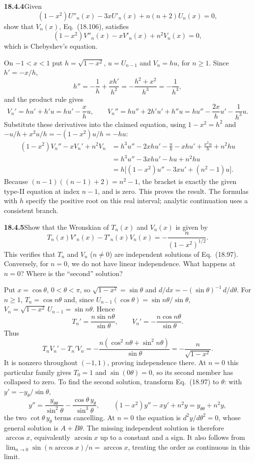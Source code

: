 \par\bigskip
\noindent\textbf{18.4.4}\quad Given
\[
(1-x^{2})U''_{n}(x)-3xU'_{n}(x)+n(n+2)U_{n}(x)=0,
\]
show that $V_{n}(x)$, Eq.~(18.106), satisfies
\[
(1-x^{2})V''_{n}(x)-xV'_{n}(x)+n^{2}V_{n}(x)=0,
\]
which is Chebyshev's equation.
\par\nobreak
\solution
On $-1<x<1$ put $h=\sqrt{1-x^2}$, $u=U_{n-1}$ and
$V_n=hu$, for $n\ge1$.  Since $h'=-x/h$,
\[
h''=-\frac1h+\frac{xh'}{h^2}=-\frac{h^2+x^2}{h^3}=-\frac1{h^3},
\]
and the product rule gives
\[
V_n'=hu'+h'u=hu'-\frac{x}{h}u,\qquad
V_n''=hu''+2h'u'+h''u=hu''-\frac{2x}{h}u'-\frac1{h^3}u.
\]
Substitute these derivatives into the claimed equation, using
$1-x^2=h^2$ and $-u/h+x^2u/h=-(1-x^2)u/h=-hu$:
\begin{align*}
(1-x^2)V_n''-xV_n'+n^2V_n
 &=h^3u''-2xhu'-\frac{u}{h}
   -xhu'+\frac{x^2u}{h}+n^2hu\\
 &=h^3u''-3xhu'-hu+n^2hu\\
 &=h\bigl[(1-x^2)u''-3xu'+(n^2-1)u\bigr].
\end{align*}
Because $(n-1)((n-1)+2)=n^2-1$, the bracket is exactly the
given type-II equation at index $n-1$, and is zero.  This proves
the result.  The formulas with $h$ specify the positive root on
this real interval; analytic continuation uses a consistent branch.

\par\bigskip
\noindent\textbf{18.4.5}\quad Show that the Wronskian of $T_{n}(x)$
and $V_{n}(x)$ is given by
\[
T_{n}(x)V'_{n}(x)-T'_{n}(x)V_{n}(x)=-\frac{n}{(1-x^{2})^{1/2}}.
\]
This verifies that $T_n$ and $V_n$ ($n\ne0$) are independent
solutions of Eq.~(18.97). Conversely, for $n=0$, we do not have linear
independence. What happens at $n=0$? Where is the ``second'' solution?
\par\nobreak
\solution
Put $x=\cos\theta$, $0<\theta<\pi$, so $\sqrt{1-x^2}=\sin\theta$ and
$d/dx=-(\sin\theta)^{-1}\,d/d\theta$.  For $n\ge1$, $T_n=\cos n\theta$ and,
since $U_{n-1}(\cos\theta)=\sin n\theta/\sin\theta$,
$V_n=\sqrt{1-x^2}\,U_{n-1}=\sin n\theta$.  Hence
\[
T_n'=\frac{n\sin n\theta}{\sin\theta},\qquad
V_n'=-\frac{n\cos n\theta}{\sin\theta}.
\]
Thus
\[
T_nV_n'-T_n'V_n
 =-\frac{n(\cos^2n\theta+\sin^2n\theta)}{\sin\theta}
 =\boxed{-\frac n{\sqrt{1-x^2}}}.
\]
It is nonzero throughout $(-1,1)$, proving independence there.
At $n=0$ this particular family gives $T_0=1$ and
$\sin(0\theta)=0$, so its second member has collapsed to zero.
To find the second solution, transform Eq.~(18.97) to $\theta$: with
$y'=-y_\theta/\sin\theta$,
\[
y''=\frac{y_{\theta\theta}}{\sin^2\theta}
   -\frac{\cos\theta\,y_\theta}{\sin^3\theta},\qquad
(1-x^2)y''-xy'+n^2y=y_{\theta\theta}+n^2y,
\]
the two $\cot\theta\,y_\theta$ terms cancelling.  At $n=0$ the
equation is $d^2y/d\theta^2=0$, whose general solution is
$A+B\theta$.  The missing independent solution is
therefore $\arccos x$, equivalently $\arcsin x$ up to a constant
and a sign.  It also follows from
$\lim_{n\to0}\sin(n\arccos x)/n=\arccos x$, treating the order
as continuous in this limit.

